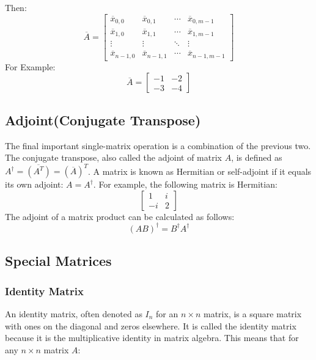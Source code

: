 \documentclass{article}
\begin{document}
Then:
\begin{equation*}
    \overline{A} =
\begin{bmatrix}
    \overline{x}_{0,0} & \overline{x}_{0,1} & \dotsb & \overline{x}_{0,m-1} \\
    \overline{x}_{1,0} & \overline{x}_{1,1} & \dotsb & \overline{x}_{1,m-1} \\
    \vdots & \vdots & \ddots & \vdots \\
    \overline{x}_{n-1,0} & \overline{x}_{n-1,1} & \dotsb & \overline{x}_{n-1,m-1}
\end{bmatrix}
\end{equation*}
For Example:
\begin{equation*}
    \overline{A} = \begin{bmatrix} -1 & -2 \\ -3 & -4 \end{bmatrix}
\end{equation*}
\subsection{Adjoint(Conjugate Transpose)}
The final important single-matrix operation is a combination of the previous two. The conjugate transpose, also called the adjoint of matrix $A$, is defined as $A^\dagger = \overline{(A^T)} = (\overline{A})^T$.
\vspace{1cm}
A matrix is known as Hermitian or self-adjoint if it equals its own adjoint: $A = A^\dagger$. For example, the following matrix is Hermitian:
\begin{equation*}
    \begin{bmatrix}
    1 & i \\
    -i & 2
\end{bmatrix}
\end{equation*}
The adjoint of a matrix product can be calculated as follows:$$(AB)^\dagger = B^\dagger A^\dagger$$
\subsection{Special Matrices}
\subsubsection{Identity Matrix}

An identity matrix, often denoted as \( I_n \) for an \( n \times n \) matrix, is a square matrix with ones on the diagonal and zeros elsewhere. It is called the identity matrix because it is the multiplicative identity in matrix algebra. This means that for any \( n \times n \) matrix \( A \):
\end{document}

